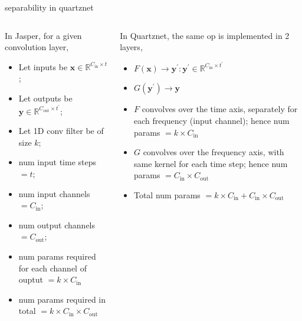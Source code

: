 \documentclass[aspectratio=169,xcolor={dvipsnames,svgnames}]{beamer}
\begin{document}
\begin{frame}[label={sec:orgf1d79c9}]{separability in quartznet}
\begin{columns}
\begin{column}{.5\columnwidth}
In Jasper, for a given convolution layer,

\begin{itemize}
\item Let inputs be
\(\mathbf{x}\in\mathbb{R}^{C_{\text{in}}\times t}\);
\item Let outputs be
\(\mathbf{y}\in\mathbb{R}^{C_{\text{out}}\times
  t^{\prime}}\);
\item Let 1D conv filter be of size \(k\);
\item num input time steps \(=t\);
\item num input channels \(=C_{\text{in}}\);
\item num output channels \(=C_{\text{out}}\);
\item num params required for each channel of ouptut
\(=k\times C_{\text{in}}\)
\item num params required in total \(=k\times
  C_{\text{in}}\times C_{\text{out}}\)
\end{itemize}
\end{column}
\begin{column}{.5\columnwidth}
In Quartznet, the same op is implemented in 2 layers,
\begin{itemize}
\item \(F(\mathbf{x})\to\mathbf{y}^{\prime} :
  \mathbf{y}^{\prime}\in\mathbb{R}^{C_{\text{in}}\times
  t^{\prime}}\)
\item \(G(\mathbf{y}^{\prime}) \to \mathbf{y}\)
\item \(F\) convolves over the time axis, separately for each
frequency (input channel); hence num params
\(=k\times C_{\text{in}}\)
\item \(G\) convolves over the frequency axis, with same
kernel for each time step; hence num params
\(=C_{\text{in}}\times C_{\text{out}}\)
\item Total num params \(=k\times C_{\text{in}} +
  C_{\text{in}}\times C_{\text{out}}\)
\end{itemize}
\end{column}
\end{columns}
\end{frame}
\end{document}
